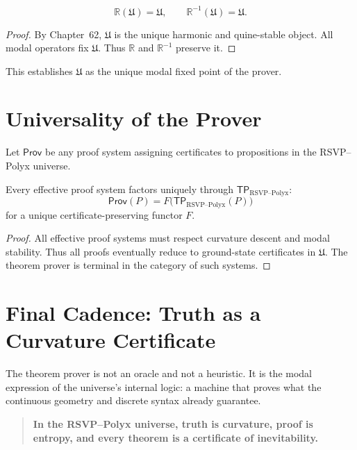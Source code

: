 \begin{theorem}
\[
\mathbb{R}(\mathfrak{U}) = \mathfrak{U},
\qquad
\mathbb{R}^{-1}(\mathfrak{U}) = \mathfrak{U}.
\]
\end{theorem}

\begin{proof}
By Chapter~62, $\mathfrak{U}$ is the unique harmonic and quine-stable
object.  
All modal operators fix $\mathfrak{U}$.  
Thus $\mathbb{R}$ and $\mathbb{R}^{-1}$ preserve it.
\end{proof}

This establishes $\mathfrak{U}$ as the unique modal fixed point of the
prover.


\section{Universality of the Prover}
\label{sec:universality}

Let $\mathsf{Prov}$ be any proof system assigning certificates to
propositions in the RSVP–Polyx universe.

\begin{theorem}
Every effective proof system factors uniquely through
$\mathsf{TP}_{\mathrm{RSVP\text{--}Polyx}}$:
\[
\mathsf{Prov}(P)
  =
F\bigl(\mathsf{TP}_{\mathrm{RSVP\text{--}Polyx}}(P)\bigr)
\]
for a unique certificate-preserving functor $F$.
\end{theorem}

\begin{proof}
All effective proof systems must respect curvature descent and modal
stability.  
Thus all proofs eventually reduce to ground-state certificates in
$\mathfrak{U}$.  
The theorem prover is terminal in the category of such systems.
\end{proof}


\section{Final Cadence: Truth as a Curvature Certificate}

The theorem prover is not an oracle and not a heuristic.
It is the modal expression of the universe’s internal logic:
a machine that proves what the continuous geometry and discrete syntax
already guarantee.

\begin{quote}
\textbf{In the RSVP--Polyx universe, truth is curvature,  
proof is entropy,  
and every theorem is a certificate of inevitability.}
\end{quote}

